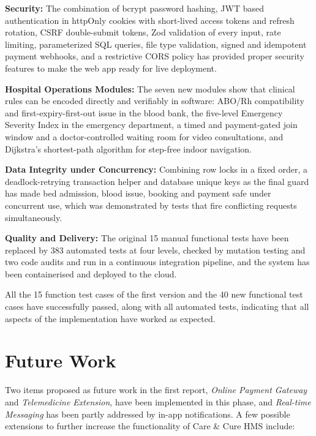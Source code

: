 \textbf{Security:} The combination of bcrypt password hashing, JWT based authentication in httpOnly cookies with short-lived access tokens and refresh rotation, CSRF double-submit tokens, Zod validation of every input, rate limiting, parameterized SQL queries, file type validation, signed and idempotent payment webhooks, and a restrictive CORS policy has provided proper security features to make the web app ready for live deployment.

\textbf{Hospital Operations Modules:} The seven new modules show that clinical rules can be encoded directly and verifiably in software: ABO/Rh compatibility and first-expiry-first-out issue in the blood bank, the five-level Emergency Severity Index in the emergency department, a timed and payment-gated join window and a doctor-controlled waiting room for video consultations, and Dijkstra's shortest-path algorithm for step-free indoor navigation.

\textbf{Data Integrity under Concurrency:} Combining row locks in a fixed order, a deadlock-retrying transaction helper and database unique keys as the final guard has made bed admission, blood issue, booking and payment safe under concurrent use, which was demonstrated by tests that fire conflicting requests simultaneously.

\textbf{Quality and Delivery:} The original 15 manual functional tests have been replaced by 383 automated tests at four levels, checked by mutation testing and two code audits and run in a continuous integration pipeline, and the system has been containerised and deployed to the cloud.

All the 15 function test cases of the first version and the 40 new functional test cases have successfully passed, along with all automated tests, indicating that all aspects of the implementation have worked as expected.

\section{Future Work}

Two items proposed as future work in the first report, \emph{Online Payment Gateway} and \emph{Telemedicine Extension}, have been implemented in this phase, and \emph{Real-time Messaging} has been partly addressed by in-app notifications. A few possible extensions to further increase the functionality of Care \& Cure HMS include:

